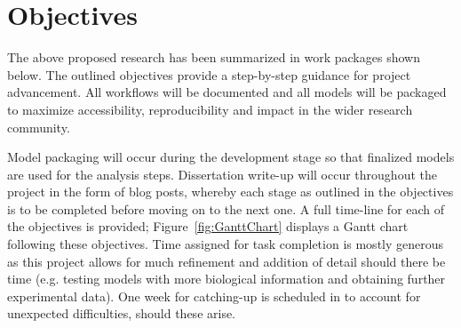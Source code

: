 \documentclass{bioinfo}
\begin{document}
\vspace{-1em}
\section{Objectives}
The above proposed research has been summarized in work packages shown below. The outlined objectives provide a step-by-step guidance for project advancement. All workflows will be documented and all models will be packaged to maximize accessibility, reproducibility and impact in the wider research community. 

Model packaging will occur during the development stage so that finalized models are used for the analysis steps. Dissertation write-up will occur throughout the project in the form of blog posts, whereby each stage as outlined in the objectives is to be completed before moving on to the next one. A full time-line for each of the objectives is provided; Figure~\ref{fig:GanttChart} displays a Gantt chart following these objectives. Time assigned for task completion is mostly generous as this project allows for much refinement and addition of detail should there be time (e.g. testing models with more biological information and obtaining further experimental data). One week for catching-up is scheduled in to account for unexpected difficulties, should these arise.
\end{document}
